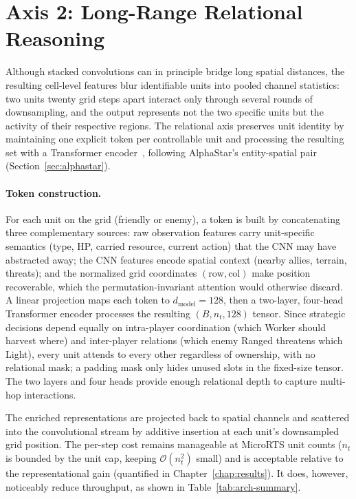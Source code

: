 \vspace{-0.5cm}

\section{Axis 2: Long-Range Relational Reasoning}
\label{sec:axis-relational}

Although stacked convolutions can in principle bridge long spatial distances, the resulting cell-level features blur identifiable units into pooled channel statistics: two units twenty grid steps apart interact only through several rounds of downsampling, and the output represents not the two specific units but the activity of their respective regions. The relational axis preserves unit identity by maintaining one explicit token per controllable unit and processing the resulting set with a Transformer encoder~\cite{vaswaniAttentionAllYou2017, zwingenbergerTransformersPoliciesVariable2023}, following AlphaStar's entity-spatial pair (Section~\ref{sec:alphastar}). 

\paragraph{Token construction.}
For each unit on the grid (friendly or enemy), a token is built by concatenating three complementary sources: raw observation features carry unit-specific semantics (type, HP, carried resource, current action) that the CNN may have abstracted away; the CNN features encode spatial context (nearby allies, terrain, threats); and the normalized grid coordinates $(\mathrm{row}, \mathrm{col})$ make position recoverable, which the permutation-invariant attention would otherwise discard. A linear projection maps each token to $d_{\mathrm{model}} = 128$, then a two-layer, four-head Transformer encoder processes the resulting $(B, n_t, 128)$ tensor. Since strategic decisions depend equally on intra-player coordination (which Worker should harvest where) and inter-player relations (which enemy Ranged threatens which Light), every unit attends to every other regardless of ownership, with no relational mask; a padding mask only hides unused slots in the fixed-size tensor. The two layers and four heads provide enough relational depth to capture multi-hop interactions.

The enriched representations are projected back to spatial channels and scattered into the convolutional stream by additive insertion at each unit's downsampled grid position. The per-step cost remains manageable at MicroRTS unit counts ($n_t$ is bounded by the unit cap, keeping $\mathcal{O}(n_t^2)$ small) and is acceptable relative to the representational gain (quantified in Chapter~\ref{chap:results}). It does, however, noticeably reduce throughput, as shown in Table~\ref{tab:arch-summary}.


